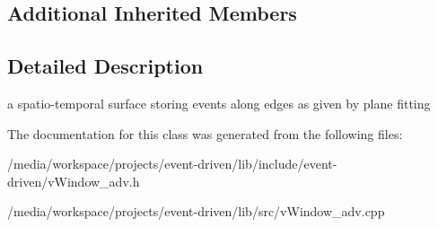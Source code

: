 \subsection*{Additional Inherited Members}


\subsection{Detailed Description}
a spatio-\/temporal surface storing events along edges as given by plane fitting 

The documentation for this class was generated from the following files\+:\begin{DoxyCompactItemize}
\item 
/media/workspace/projects/event-\/driven/lib/include/event-\/driven/v\+Window\+\_\+adv.\+h\item 
/media/workspace/projects/event-\/driven/lib/src/v\+Window\+\_\+adv.\+cpp\end{DoxyCompactItemize}
